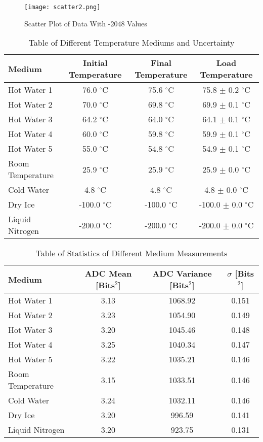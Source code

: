 \documentclass[10pt, preprint]{aastex}
\begin{document}
\begin{figure}[H]
\centering
\footnotesize
\texttt{[image: scatter2.png]}
\caption{\label{fig:scatter2}Scatter Plot of Data With -2048 Values}
\end{figure}

\begin{table}[H]
\centering
\begin{tabular}{lccc}
\hline
Medium & Initial Temperature & Final Temperature &Load Temperature\\\hline
Hot Water 1 & 76.0 $^\circ\mathrm{C}$ &75.6 $^\circ\mathrm{C}$ & 75.8 $\pm$ 0.2 $^\circ\mathrm{C}$  \\
Hot Water 2 & 70.0 $^\circ\mathrm{C}$ & 69.8 $^\circ\mathrm{C}$ & 69.9 $\pm$ 0.1 $^\circ\mathrm{C}$\\
Hot Water 3 & 64.2 $^\circ\mathrm{C}$ & 64.0 $^\circ\mathrm{C}$ & 64.1 $\pm$ 0.1 $^\circ\mathrm{C}$ \\
Hot Water 4 & 60.0 $^\circ\mathrm{C}$& 59.8 $^\circ\mathrm{C}$ & 59.9 $\pm$ 0.1 $^\circ\mathrm{C}$\\
Hot Water 5& 55.0 $^\circ\mathrm{C}$& 54.8 $^\circ\mathrm{C}$ & 54.9 $\pm$ 0.1 $^\circ\mathrm{C}$\\
Room Temperature & 25.9 $^\circ\mathrm{C}$& 25.9 $^\circ\mathrm{C}$ & 25.9 $\pm$ 0.0 $^\circ\mathrm{C}$ \\
Cold Water & 4.8 $^\circ\mathrm{C}$ & 4.8 $^\circ\mathrm{C}$ & 4.8 $\pm$ 0.0 $^\circ\mathrm{C}$ \\
Dry Ice & -100.0 $^\circ\mathrm{C}$& -100.0 $^\circ\mathrm{C}$ & -100.0  $\pm$ 0.0 $^\circ\mathrm{C}$\\
Liquid Nitrogen & -200.0 $^\circ\mathrm{C}$& -200.0 $^\circ\mathrm{C}$ & -200.0  $\pm$ 0.0 $^\circ\mathrm{C}$ \\
\end{tabular}
\caption{\label{Temperature Mediums Table}Table of Different Temperature Mediums and Uncertainty}
\end{table}

\begin{table}[H]
\centering
\footnotesize
\begin{tabular}{lccc}
\hline
Medium & ADC Mean [Bits$^2$] & ADC Variance [Bits$^2$] & $\sigma$ [Bits$^2$] \\
\hline
Hot Water 1 & 3.13 & 1068.92 & 0.151 \\
Hot Water 2 & 3.23 & 1054.90 & 0.149 \\
Hot Water 3 & 3.20 & 1045.46 & 0.148 \\
Hot Water 4 & 3.25 & 1040.34 & 0.147 \\
Hot Water 5 & 3.22 & 1035.21 & 0.146 \\
Room Temperature & 3.15 & 1033.51 & 0.146 \\
Cold Water & 3.24 & 1032.11 & 0.146 \\
Dry Ice & 3.20 & 996.59 & 0.141 \\
Liquid Nitrogen & 3.20 & 923.75 & 0.131 \\
\hline
\end{tabular}

\caption{\label{table:statstabletemp}Table of Statistics of Different Medium Measurements}
\end{table}
\end{document}
